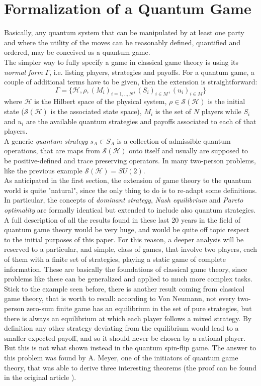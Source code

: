 \hfill

\section{Formalization of a Quantum Game}
Basically, any quantum system that can be manipulated by at least one
party and where the utility of the moves can be reasonably defined, quantified and ordered, may be conceived as a quantum game.\\
The simpler way to fully specify a game in classical game theory is using its \textit{normal form} $\Gamma$, i.e. listing players, strategies and payoffs. For a quantum game, a couple of  additional terms have to be given, then the extension is straightforward:
\[ \Gamma = \{ \mathcal{H}, \rho, (M_i)_{i=1,..,N}, (S_i)_{i\in M}, (u_i)_{i\in M} \} \]
where $\mathcal{H}$ is the Hilbert space of the physical system, $\rho\in\mathcal{S}(\mathcal{H})$ is the initial state ($\mathcal{S}(\mathcal{H})$ is the associated state space), $M_i$ is the set of $N$ players while $S_i$ and $u_i$ are the available quantum strategies and payoffs associated to each of that players.\\
A generic \textit{quantum strategy} $s_A\in S_A$ is a collection of admissible quantum operations, that are maps from $\mathcal{S}(\mathcal{H})$ onto itself and usually are supposed to be positive-defined and trace preserving operators. In many two-person problems, like the previous example $\mathcal{S}(\mathcal{H}) = SU(2)$.\\
As anticipated in the first section, the extension of game theory to the quantum world is quite "natural", since the only thing to do is to re-adapt some definitions. In particular, the concepts of \textit{dominant strategy}, \textit{Nash equilibrium} and \textit{Pareto optimality} are formally identical but extended to include also quantum strategies.\\
A full description of all the results found in these last 20 years in the field of quantum game theory would be very huge, and would be quite off topic respect to the initial purposes of this paper. For this reason, a deeper analysis will be reserved to a particular, and simple, class of games, that involve two players, each of them with a finite set of strategies, playing a static game of complete information. These are basically the foundations of classical game theory, since problems like these can be generalized and applied to much more complex tasks.\\
Stick to the example seen before, there is another result coming from classical game theory, that is worth to recall: according to Von Neumann, not every two-person zero-sum finite game has an equilibrium in the set of pure strategies, but there is always an equilibrium at which each player follows a mixed strategy. By definition any other strategy deviating from the equilibrium would lead to a smaller expected payoff, and so it should never be chosen by a rational player. But this is not what shown instead in the quantum spin-flip game. The answer to this problem was found by A. Meyer, one of the initiators of quantum game theory, that was able to derive three interesting theorems (the proof can be found in the original article \cite{Meyer_1999}).
